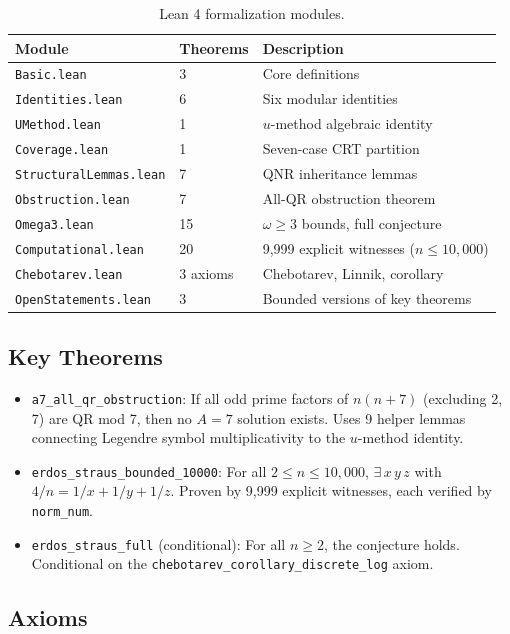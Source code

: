 \documentclass[11pt,a4paper]{article}
\theoremstyle{plain}
\theoremstyle{plain}
\theoremstyle{definition}
\numberwithin{equation}{section}
\begin{document}
\begin{table}[h]
\centering
\begin{tabular}{lll}
\toprule
Module & Theorems & Description \\
\midrule
\texttt{Basic.lean} & 3 & Core definitions \\
\texttt{Identities.lean} & 6 & Six modular identities \\
\texttt{UMethod.lean} & 1 & $u$-method algebraic identity \\
\texttt{Coverage.lean} & 1 & Seven-case CRT partition \\
\texttt{StructuralLemmas.lean} & 7 & QNR inheritance lemmas \\
\texttt{Obstruction.lean} & 7 & All-QR obstruction theorem \\
\texttt{Omega3.lean} & 15 & $\omega \geq 3$ bounds, full conjecture \\
\texttt{Computational.lean} & 20 & 9,999 explicit witnesses ($n \leq 10{,}000$) \\
\texttt{Chebotarev.lean} & 3 axioms & Chebotarev, Linnik, corollary \\
\texttt{OpenStatements.lean} & 3 & Bounded versions of key theorems \\
\bottomrule
\end{tabular}
\caption{Lean 4 formalization modules.}
\end{table}

\subsection{Key Theorems}

\begin{itemize}[noitemsep]
  \item \texttt{a7\_all\_qr\_obstruction}: If all odd prime factors of $n(n+7)$ (excluding 2, 7) are QR mod 7, then no $A = 7$ solution exists. Uses 9 helper lemmas connecting Legendre symbol multiplicativity to the $u$-method identity.
  \item \texttt{erdos\_straus\_bounded\_10000}: For all $2 \leq n \leq 10{,}000$, $\exists\, x\, y\, z$ with $4/n = 1/x + 1/y + 1/z$. Proven by 9,999 explicit witnesses, each verified by \texttt{norm\_num}.
  \item \texttt{erdos\_straus\_full} (conditional): For all $n \geq 2$, the conjecture holds. Conditional on the \texttt{chebotarev\_corollary\_discrete\_log} axiom.
\end{itemize}

\subsection{Axioms}
\end{document}
